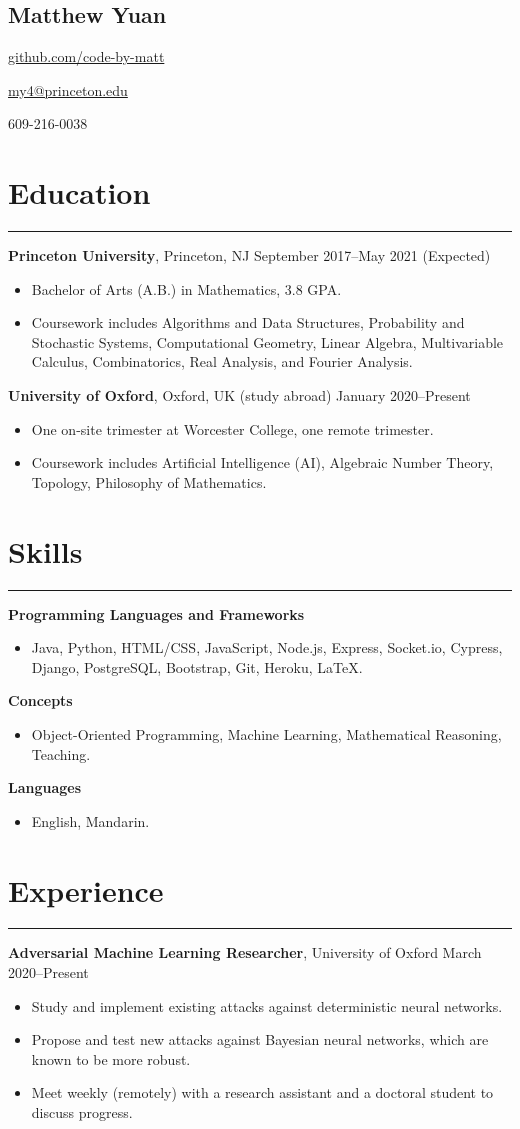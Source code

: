 \documentclass[10pt]{article}
\newcommand{\name}[1]{\begin{center}\section*{\huge #1}\end{center}}
\newcommand{\topinfo}[1]{\begin{center}\vspace{-0.2cm}#1\vspace{-0.2cm}\end{center}}
\newcommand{\resumesection}[1]{\vspace{-0.2cm}\section*{#1}\vspace{-0.2cm}\hrule\vspace{0.2cm}}
\begin{document}
\name{Matthew Yuan}
\topinfo{\href{https://github.com/code-by-matt}{github.com/code-by-matt}}
\topinfo{\href{mailto:my4@princeton.edu}{my4@princeton.edu}}
\topinfo{609-216-0038}

\resumesection{Education}

\textbf{Princeton University}, Princeton, NJ \hfill September 2017--May 2021 (Expected)
\begin{itemize}
	\item Bachelor of Arts (A.B.) in Mathematics, 3.8 GPA.
	\item Coursework includes Algorithms and Data Structures, Probability and Stochastic Systems, Computational Geometry, Linear Algebra, Multivariable Calculus, Combinatorics, Real Analysis, and Fourier Analysis.
\end{itemize}

\textbf{University of Oxford}, Oxford, UK (study abroad) \hfill January 2020--Present
\begin{itemize}
	\item One on-site trimester at Worcester College, one remote trimester.
	\item Coursework includes Artificial Intelligence (AI), Algebraic Number Theory, Topology, Philosophy of Mathematics.
\end{itemize}

\resumesection{Skills}

\textbf{Programming Languages and Frameworks}
\begin{itemize}
	\item Java, Python, HTML/CSS, JavaScript, Node.js, Express, Socket.io, Cypress, Django, PostgreSQL, Bootstrap, Git, Heroku, \LaTeX.
\end{itemize}

\textbf{Concepts}
\begin{itemize}
	\item Object-Oriented Programming, Machine Learning, Mathematical Reasoning, Teaching.
\end{itemize}

\textbf{Languages}
\begin{itemize}
	\item English, Mandarin.
\end{itemize}

\resumesection{Experience}

\textbf{Adversarial Machine Learning Researcher}, University of Oxford \hfill March 2020--Present
\begin{itemize}
	\item Study and implement existing attacks against deterministic neural networks.
	\item Propose and test new attacks against Bayesian neural networks, which are known to be more robust.
	\item Meet weekly (remotely) with a research assistant and a doctoral student to discuss progress.
\end{itemize}
\end{document}
